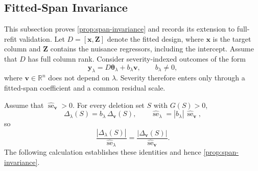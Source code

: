 \documentclass[../main.tex]{subfiles}
\begin{document}
\subsection{Fitted-Span Invariance}
\label{app:deriv-invariance}

This subsection proves \autoref{prop:span-invariance} and records its extension to full-refit validation. Let \(D=[\mathbf{x},\mathbf{Z}]\) denote the fitted design, where \(\mathbf{x}\) is the target column and \(\mathbf{Z}\) contains the nuisance regressors, including the intercept. Assume that \(D\) has full column rank. Consider severity-indexed outcomes of the form
\begin{equation}
	\mathbf{y}_\lambda
	=
	D\boldsymbol{\theta}_\lambda
	+
	b_\lambda\mathbf{v},
	\qquad
	b_\lambda\neq0,
	\label{eq:span-outcome}
\end{equation}
where \(\mathbf{v}\in\mathbb{R}^n\) does not depend on \(\lambda\). Severity therefore enters only through a fitted-span coefficient and a common residual scale.

Assume that \(\widehat{\operatorname{se}}_{\mathbf v}>0\). For every deletion set \(S\) with \(G(S)>0\),
\[
\Delta_\lambda(S)=b_\lambda\,\Delta_{\mathbf{v}}(S),
\qquad
\widehat{\operatorname{se}}_\lambda
=
|b_\lambda|\,\widehat{\operatorname{se}}_{\mathbf{v}},
\]
so
\[
\frac{|\Delta_\lambda(S)|}
{\widehat{\operatorname{se}}_\lambda}
=
\frac{|\Delta_{\mathbf{v}}(S)|}
{\widehat{\operatorname{se}}_{\mathbf{v}}}.
\]
The following calculation establishes these identities and hence \autoref{prop:span-invariance}.
\end{document}

